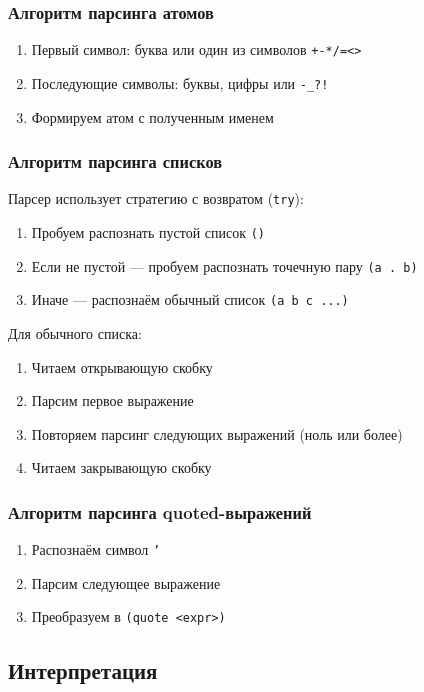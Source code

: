 \documentclass[a4paper,12pt]{article}
\begin{document}
\subsubsection{Алгоритм парсинга атомов}
\begin{enumerate}
    \item Первый символ: буква или один из символов \texttt{+-*/=<>}
    \item Последующие символы: буквы, цифры или \texttt{-\_?!}
    \item Формируем атом с полученным именем
\end{enumerate}

\subsubsection{Алгоритм парсинга списков}
Парсер использует стратегию с возвратом (\texttt{try}):

\begin{enumerate}
    \item Пробуем распознать пустой список \texttt{()}
    \item Если не пустой — пробуем распознать точечную пару \texttt{(a . b)}
    \item Иначе — распознаём обычный список \texttt{(a b c ...)}
\end{enumerate}

Для обычного списка:
\begin{enumerate}
    \item Читаем открывающую скобку
    \item Парсим первое выражение
    \item Повторяем парсинг следующих выражений (ноль или более)
    \item Читаем закрывающую скобку
\end{enumerate}

\subsubsection{Алгоритм парсинга quoted-выражений}
\begin{enumerate}
    \item Распознаём символ \texttt{'}
    \item Парсим следующее выражение
    \item Преобразуем в \texttt{(quote <expr>)}
\end{enumerate}

\subsection{Интерпретация}
\end{document}

